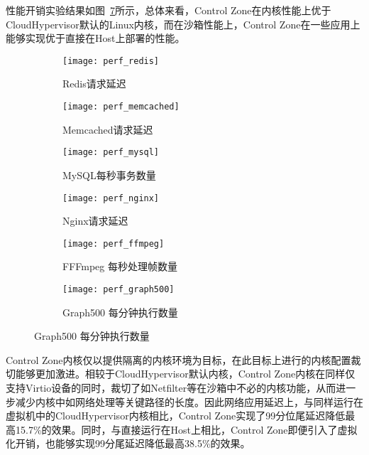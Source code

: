 性能开销实验结果如图~\ref{fig:perf_app}所示，总体来看，Control Zone在内核性能上优于CloudHypervisor默认的Linux内核，而在沙箱性能上，Control Zone在一些应用上能够实现优于直接在Host上部署的性能。

\begin{figure}[!htbp]
    \centering
    \begin{subfigure}[b]{0.32\textwidth}
        \texttt{[image: perf\_redis]}
        \caption{\quad Redis请求延迟}
        \label{fig:perf_redis}
    \end{subfigure}
    \begin{subfigure}[b]{0.32\textwidth}
        \texttt{[image: perf\_memcached]}
        \caption{\quad Memcached请求延迟}
        \label{fig:perf_memcached}
    \end{subfigure}
    \begin{subfigure}[b]{0.32\textwidth}
        \texttt{[image: perf\_mysql]}
        \caption{\quad MySQL每秒事务数量}
        \label{fig:perf_mysql}
    \end{subfigure}
    \begin{subfigure}[b]{0.32\textwidth}
        \texttt{[image: perf\_nginx]}
        \caption{\quad Nginx请求延迟}
        \label{fig:perf_nginx}
    \end{subfigure}
    \begin{subfigure}[b]{0.32\textwidth}
        \texttt{[image: perf\_ffmpeg]}
        \caption{\quad FFFmpeg 每秒处理帧数量}
        \label{fig:perf_ffmpeg}
    \end{subfigure}
    \begin{subfigure}[b]{0.32\textwidth}
        \texttt{[image: perf\_graph500]}
        \caption{\quad Graph500 每分钟执行数量}
        \label{fig:perf_graph500}
    \end{subfigure}
\label{fig:perf_app}
\end{figure}

Control Zone内核仅以提供隔离的内核环境为目标，在此目标上进行的内核配置裁切能够更加激进。相较于CloudHypervisor默认内核，Control Zone内核在同样仅支持Virtio设备的同时，裁切了如Netfilter等在沙箱中不必的内核功能，从而进一步减少内核中如网络处理等关键路径的长度。因此网络应用延迟上，与同样运行在虚拟机中的CloudHypervisor内核相比，Control Zone实现了99分位尾延迟降低最高15.7\%的效果。同时，与直接运行在Host上相比，Control Zone即便引入了虚拟化开销，也能够实现99分尾延迟降低最高38.5\%的效果。

